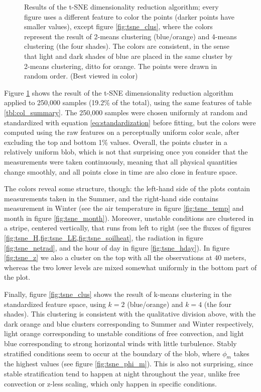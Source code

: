 \documentclass[a4paper]{book}
\begin{document}
\begin{figure}
    \caption{Results of the t-SNE dimensionality reduction algorithm; every figure uses a different feature to color the points (darker points have smaller values), except figure \ref{fig:tsne_clus}, where the colors represent the result of 2-means clustering (blue/orange) and 4-means clustering (the four shades). The colors are consistent, in the sense that light and dark shades of blue are placed in the same cluster by 2-means clustering, ditto for orange. The points were drawn in random order. (Best viewed in color)}
	\label{fig:tsne}
\end{figure}


Figure \ref{fig:tsne} shows the result of the t-SNE dimensionality reduction algorithm \citep{tsne} applied to 250,000 samples (19.2\% of the total), using the same features of table \ref{tbl:col_summary}. The 250,000 samples were chosen uniformly at random and standardized with equation \ref{eq:standardization} before fitting, but the colors were computed using the raw features on a perceptually uniform color scale, after excluding the top and bottom 1\% values. Overall, the points cluster in a relatively uniform blob, which is not that surprising once you consider that the measurements were taken continuously, meaning that all physical quantities change smoothly, and all points close in time are also close in feature space.

The colors reveal some structure, though: the left-hand side of the plots contain measurements taken in the Summer, and the right-hand side contains measurement in Winter (see the air temperature in figure \ref{fig:tsne_temp} and month in figure \ref{fig:tsne_month}). Moreover, unstable conditions are clustered in a stripe, centered vertically, that runs from left to right (see the fluxes of figures \cref{fig:tsne_H,fig:tsne_LE,fig:tsne_soilheat}, the radiation in figure \ref{fig:tsne_netrad}, and the hour of day in figure \ref{fig:tsne_hday}). In figure \ref{fig:tsne_z} we also a cluster on the top with all the observations at 40 meters, whereas the two lower levels are mixed somewhat uniformly in the bottom part of the plot.

Finally, figure \ref{fig:tsne_clus} shows the result of k-means clustering in the standardized feature space, using $k=2$ (blue/orange) and $k=4$ (the four shades). This clustering is consistent with the qualitative division above, with the dark orange and blue clusters corresponding to Summer and Winter respectively, light orange corresponding to unstable conditions of free convection, and light blue corresponding to strong horizontal winds with little turbulence. Stably stratified conditions seem to occur at the boundary of the blob, where $\phi_m$ takes the highest values (see figure \ref{fig:tsne_phi_m}). This is also not surprising, since stable stratification tend to happen at night throughout the year, unlike free convection or z-less scaling, which only happen in specific conditions.
\end{document}
